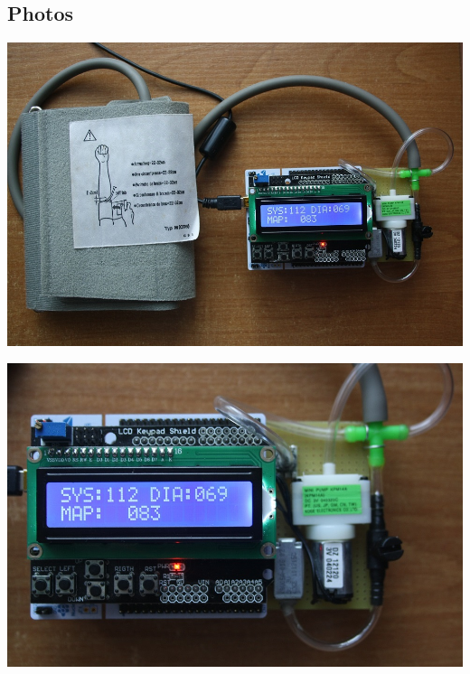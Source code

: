 \subsection*{Photos}


\begin{DoxyImage}
\includegraphics[width=\textwidth,height=\textheight/2,keepaspectratio=true]{IMG_4834.png}
\end{DoxyImage}



\begin{DoxyImage}
\includegraphics[width=\textwidth,height=\textheight/2,keepaspectratio=true]{IMG_4839.png}
\end{DoxyImage}




